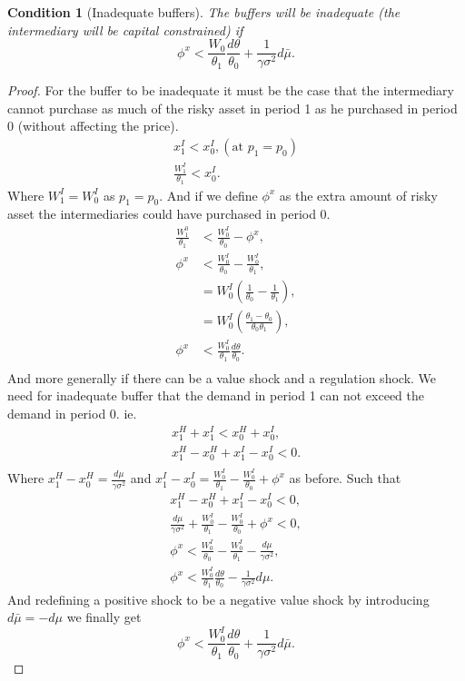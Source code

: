 \documentclass[11pt]{article}
\newtheorem{condition}{Condition}
\begin{document}
\begin{appendices}
\begin{condition}[Inadequate buffers] \label{c_inadequateBuffers}
The buffers will be inadequate (the intermediary will be capital constrained) if 
\begin{equation}
\phi^x < \frac{W_0}{\theta_1}\frac{d\theta}{\theta_0}+\frac{1}{\gamma\sigma^2}d\bar{\mu}.
\end{equation}
\end{condition}
\begin{proof}
For the buffer to be inadequate it must be the case that the intermediary cannot purchase as much of the risky asset in period 1 as he purchased in period 0 (without affecting the price).
\begin{align*}
x^I_1 < x^I_0, (\text{at } p_1 = p_0)\\
\frac{W^I_1}{\theta_1} < x^I_0.
\end{align*}
Where $W^I_1 = W^I_0$ as $p_1 = p_0$. And if we define $\phi^x$ as the extra amount of risky asset the intermediaries could have purchased in period 0.
\begin{align*}
\frac{W^0_1}{\theta_1} &< \frac{W^I_0}{\theta_0} - \phi^x,\\
\phi^x &< \frac{W^I_0}{\theta_0} - \frac{W^I_0}{\theta_1},\\
&= W^I_0 \left(\frac{1}{\theta_0} - \frac{1}{\theta_1}\right),\\
&= W^I_0 \left(\frac{\theta_1 - \theta_0}{\theta_0 \theta_1}\right),\\
\phi^x &< \frac{W^I_0}{\theta_1} \frac{d\theta}{\theta_0}.\\
\end{align*}
And more generally if there can be a value shock and a regulation shock. We need for inadequate buffer that the demand in period 1 can not exceed the demand in period 0. ie.
\begin{align*}
x^H_1 + x^I_1 < x^H_0 + x^I_0,\\
x^H_1 - x^H_0 + x^I_1 - x^I_0 < 0.\\
\end{align*}
Where $x^H_1 - x^H_0 = \frac{d\mu}{\gamma\sigma^2}$ and $x^I_1 - x^I_0 = \frac{W^I_0}{\theta_1} - \frac{W^I_0}{\theta_0} + \phi^x$ as before. Such that
\begin{align*}
x^H_1 - x^H_0 + x^I_1 - x^I_0 < 0,\\
\frac{d\mu}{\gamma\sigma^2} + \frac{W^I_0}{\theta_1} - \frac{W^I_0}{\theta_0} + \phi^x < 0,\\
\phi^x < \frac{W^I_0}{\theta_0} - \frac{W^I_0}{\theta_1} - \frac{d\mu}{\gamma\sigma^2},\\
\phi^x < \frac{W^I_0}{\theta_1} \frac{d\theta}{\theta_0} - \frac{1}{\gamma\sigma^2}d\mu.
\end{align*}
And redefining a positive shock to be a negative value shock by introducing $d\bar{\mu} = -d\mu$ we finally get
\begin{equation}
\phi^x < \frac{W^I_0}{\theta_1} \frac{d\theta}{\theta_0} + \frac{1}{\gamma\sigma^2}d\bar{\mu}.
\end{equation} 
\end{proof}


\end{appendices}
\end{document}
